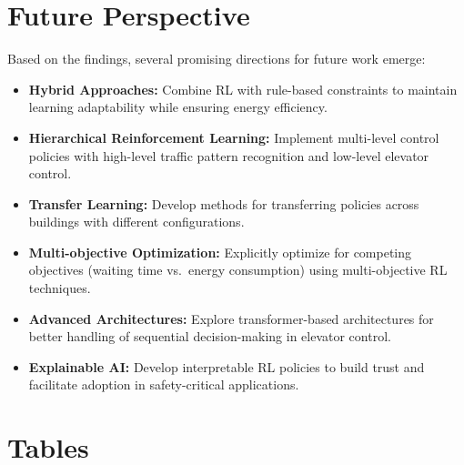 \documentclass[10pt,twocolumn]{article}
\begin{document}
\section{Future Perspective}
Based on the findings, several promising directions for future work emerge:

\begin{itemize}
    \item \textbf{Hybrid Approaches:} Combine RL with rule-based constraints to maintain learning adaptability while ensuring energy efficiency.

    \item \textbf{Hierarchical Reinforcement Learning:} Implement multi-level control policies with high-level traffic pattern recognition and low-level elevator control.

    \item \textbf{Transfer Learning:} Develop methods for transferring policies across buildings with different configurations.

    \item \textbf{Multi-objective Optimization:} Explicitly optimize for competing objectives (waiting time vs.\ energy consumption) using multi-objective RL techniques.

    \item \textbf{Advanced Architectures:} Explore transformer-based architectures for better handling of sequential decision-making in elevator control.

    \item \textbf{Explainable AI:} Develop interpretable RL policies to build trust and facilitate adoption in safety-critical applications.
\end{itemize}

\appendix
\clearpage                %
\onecolumn              %

\section{Tables}
\FloatBarrier             %
\end{document}
